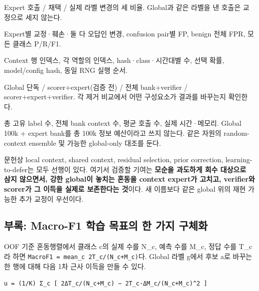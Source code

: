 \par\noindent \textbullet\enspace Expert 호출 /\allowbreak{} 채택 /\allowbreak{} 실제 라벨 변경의 세 비율. Global과 같은 라벨을 낸 호출은 교정으로 세지 않는다.


\par\noindent \textbullet\enspace Expert별 교정·훼손·둘 다 오답인 변경, confusion pair별 FP, benign 전체 FPR, 모든 클래스 P/\allowbreak{}R/\allowbreak{}F1.


\par\noindent \textbullet\enspace Context 행 인덱스, 각 역할의 인덱스, hash·class·시간대별 수, 선택 확률, model/\allowbreak{}config hash, 동일 RNG 실행 순서.


\par\noindent \textbullet\enspace Global 단독 /\allowbreak{} scorer+\allowbreak{}expert(검증 전) /\allowbreak{} 전체 bank+\allowbreak{}verifier /\allowbreak{} scorer+\allowbreak{}expert+\allowbreak{}verifier. 각 제거 비교에서 어떤 구성요소가 결과를 바꾸는지 확인한다.


\par\noindent \textbullet\enspace 총 고유 label 수, 전체 bank context 수, 평균 호출 수, 실제 시간·메모리. Global 100k +\allowbreak{} expert bank를 총 100k 정보 예산이라고 쓰지 않는다. 같은 자원의 random-context ensemble 및 가능한 global-only 대조를 둔다.


문헌상 local context, shared context, residual selection, prior correction, learning-to-defer는 모두 선행이 있다. 여기서 검증할 기여는 \textbf{모순을 과도하게 회수 대상으로 삼지 않으면서, 강한 global이 놓치는 혼동을 context expert가 고치고, verifier와 scorer가 그 이득을 실제로 보존한다는 것}이다. 새 이름보다 같은 global 위의 재현 가능한 추가 교정이 우선이다.

\subsection{부록: Macro-F1 학습 목표의 한 가지 구체화}
OOF 기준 혼동행렬에서 클래스 c의 실제 수를 N\_\allowbreak{}c, 예측 수를 M\_\allowbreak{}c, 정답 수를 T\_\allowbreak{}c라 하면 \texttt{MacroF1 \allowbreak{}=\allowbreak{}\allowbreak{} mean\_\allowbreak{}\allowbreak{}c\allowbreak{} 2T\_\allowbreak{}\allowbreak{}c/\allowbreak{}\allowbreak{}(N\allowbreak{}\_\allowbreak{}\allowbreak{}c+\allowbreak{}\allowbreak{}M\_\allowbreak{}\allowbreak{}c)}다. Global 라벨 g에서 후보 a로 바꾸는 한 행에 대해 다음 1차 근사 이득을 만들 수 있다.

\texttt{u =\allowbreak{}\allowbreak{} (1/\allowbreak{}\allowbreak{}K\allowbreak{}) Σ\_\allowbreak{}\allowbreak{}c [ \allowbreak{}2ΔT\_\allowbreak{}\allowbreak{}c/\allowbreak{}\allowbreak{}(N\allowbreak{}\_\allowbreak{}\allowbreak{}c+\allowbreak{}\allowbreak{}M\_\allowbreak{}\allowbreak{}c) \allowbreak{}− 2T\_\allowbreak{}\allowbreak{}c·Δ\allowbreak{}M\_\allowbreak{}\allowbreak{}c/\allowbreak{}\allowbreak{}(N\_\allowbreak{}\allowbreak{}c\allowbreak{}+\allowbreak{}\allowbreak{}M\_\allowbreak{}\allowbreak{}c)\textasciicircum{}2 \allowbreak{}]}


